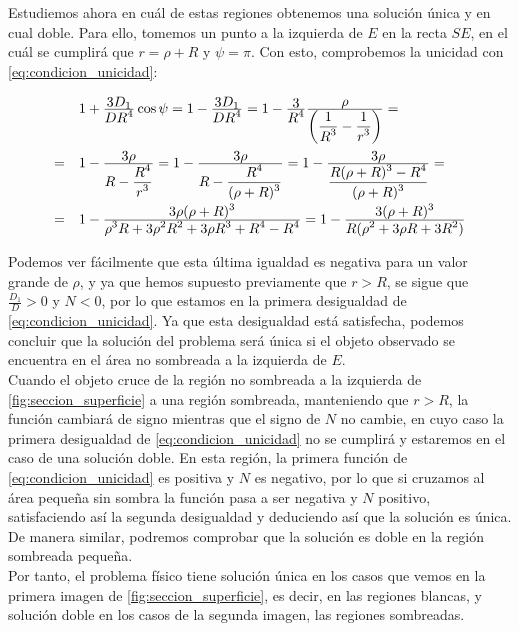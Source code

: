 \documentclass[11pt]{article}
\newcommand\ddfrac[2]{\frac{\displaystyle #1}{\displaystyle #2}}
\begin{document}
Estudiemos ahora en cuál de estas regiones obtenemos una solución única y en cual doble. Para ello, tomemos un punto a la izquierda de $E$ en la recta $SE$, en el cuál se cumplirá que $r=\rho+R$ y $\psi=\pi$. Con esto, comprobemos la unicidad con \eqref{eq:condicion_unicidad}:
\[
\def\arraystretch{2}
\begin{array}{ll}
  & 1+\ddfrac{3D_1}{DR^4}\cos{\psi} = 1-\ddfrac{3D_1}{DR^4} = 1-\ddfrac{3}{R^4}\ddfrac{\rho}{\left(\ddfrac{1}{R^3}-\ddfrac{1}{r^3}\right)} = \\
= & 1-\ddfrac{3\rho}{R-\ddfrac{R^4}{r^3}} = 1-\ddfrac{3\rho}{R-\ddfrac{R^4}{(\rho+R)^3}} = 1-\ddfrac{3\rho}{\ddfrac{R(\rho+R)^3-R^4}{(\rho+R)^3}} = \\
= & 1-\ddfrac{3\rho(\rho+R)^3}{\rho^3R+3\rho^2R^2+3\rho R^3+R^4-R^4} = 1-\ddfrac{3(\rho+R)^3}{R(\rho^2+3\rho R+3R^2)}
\end{array}
\]

Podemos ver fácilmente que esta última igualdad es negativa para un valor grande de $\rho$, y ya que hemos supuesto previamente que $r>R$, se sigue que $\ddfrac{D_1}{D}>0$ y $N<0$, por lo que estamos en la primera desigualdad de \eqref{eq:condicion_unicidad}. Ya que esta desigualdad está satisfecha, podemos concluir que la solución del problema será única si el objeto observado se encuentra en el área no sombreada a la izquierda de $E$.\\

Cuando el objeto cruce de la región no sombreada a la izquierda de \ref{fig:seccion_superficie} a una región sombreada, manteniendo que $r>R$, la función cambiará de signo mientras que el signo de $N$ no cambie, en cuyo caso la primera desigualdad de \eqref{eq:condicion_unicidad} no se cumplirá y estaremos en el caso de una solución doble. En esta región, la primera función de \eqref{eq:condicion_unicidad} es positiva y $N$ es negativo, por lo que si cruzamos al área pequeña sin sombra la función pasa a ser negativa y $N$ positivo, satisfaciendo así la segunda desigualdad y deduciendo así que la solución es única. De manera similar, podremos comprobar que la solución es doble en la región sombreada pequeña.\\

Por tanto, el problema físico tiene solución única en los casos que vemos en la primera imagen de \ref{fig:seccion_superficie}, es decir, en las regiones blancas, y solución doble en los casos de la segunda imagen, las regiones sombreadas.\\
\end{document}
